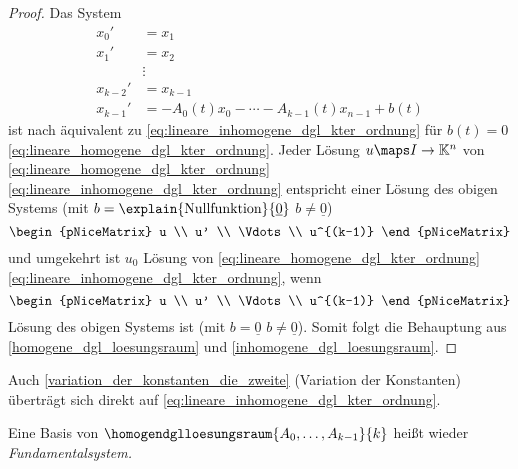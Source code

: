 \begin{proof}
  Das System 
  \begin{align*}
    x_0'&=x_1\\
    x_1'&=x_2\\
    &\vdots\\
    x_{k-2}'&=x_{k-1}\\
    x_{k-1}'&=-A_0(t)x_0-\dotsb-A_{k-1}(t)x_{n-1}+b(t)
  \end{align*}
  ist nach  äquivalent zu \eqref{eq:lineare_inhomogene_dgl_kter_ordnung} \bzw für \( b(t)=0 \) \eqref{eq:lineare_homogene_dgl_kter_ordnung}. Jeder Lösung \( u\maps I\to \mathbb{K}^n \) von \eqref{eq:lineare_homogene_dgl_kter_ordnung} \bzw \eqref{eq:lineare_inhomogene_dgl_kter_ordnung} entspricht einer Lösung des obigen Systems (mit \( b=\explain{\text{Nullfunktion}}{\underline{0}} \) \bzw \( b\neq \underline{0} \))
  \begin{equation*}
    \begin{pNiceMatrix} u \\ u' \\ \Vdots \\ u^{(k-1)} \end{pNiceMatrix}  
  \end{equation*}
  und umgekehrt ist \( u_0 \) Lösung von \eqref{eq:lineare_homogene_dgl_kter_ordnung} \bzw \eqref{eq:lineare_inhomogene_dgl_kter_ordnung}, wenn
  \begin{equation*}
    \begin{pNiceMatrix} u \\ u' \\ \Vdots \\ u^{(k-1)} \end{pNiceMatrix}  
  \end{equation*}
  Lösung des obigen Systems ist (mit \( b=\underline{0} \) \bzw \( b\neq \underline{0} \)). Somit folgt die Behauptung aus \ref{homogene_dgl_loesungsraum} und \ref{inhomogene_dgl_loesungsraum}.
\end{proof}
\begin{bemerkung*}
  Auch \ref{variation_der_konstanten_die_zweite} (Variation der Konstanten) überträgt sich direkt auf \eqref{eq:lineare_inhomogene_dgl_kter_ordnung}.
\end{bemerkung*}
\begin{notation*}
  Eine Basis von \( \homogendglloesungsraum{A_0,\dotsc,A_{k-1}}{k} \) heißt wieder \emph{Fundamentalsystem.}
\end{notation*}
